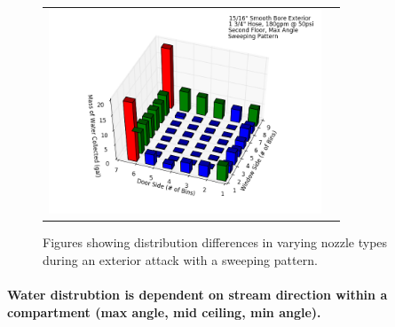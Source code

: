 \documentclass{article}
\begin{document}
\begin{figure}[ht]
\begin{tabular*}{\textwidth}{lr}
\includegraphics[width=3.2in]{../ADD_Analysis/Figures/15-12-07_121014_Datafile_15_16in_Smooth_Bore_Exterior.png} \\
\end{tabular*}
\caption{Figures showing distribution differences in varying nozzle types during an exterior attack with a sweeping pattern.}
\label{fig:Exterior_Varying_Nozzle_Types_Sweeping_Pattern}
\end{figure}

\clearpage

\paragraph{Water distrubtion is dependent on stream direction within a compartment (max angle, mid ceiling, min angle).} \mbox{}


\end{document}
